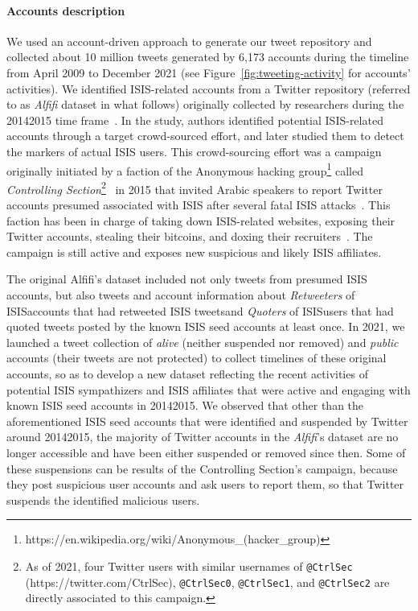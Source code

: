 \documentclass[letterpaper]{article} %
\begin{document}

\paragraph{Accounts description} We used an account-driven approach to generate our tweet repository and  collected about 10 million tweets generated  by 6,173 accounts during the timeline from April 2009 to December 2021 (see Figure~\ref{fig:tweeting-activity} for accounts' activities).
We identified ISIS-related accounts  from a Twitter repository (referred to as \textit{Alfifi} dataset in what follows) originally collected by researchers during the 20142015 time frame~\cite{alfifi2018measuring}. In the study, authors   identified  potential ISIS-related accounts through a target crowd-sourced effort, and later studied them to detect  the markers of actual ISIS users. This crowd-sourcing effort was a campaign originally initiated by a faction of the Anonymous hacking group\footnote{https://en.wikipedia.org/wiki/Anonymous\_(hacker\_group)} called \textit{Controlling Section}\footnote{As of 2021, four Twitter users with similar usernames of \texttt{@CtrlSec} (https://twitter.com/CtrlSec), \texttt{@CtrlSec0}, \texttt{@CtrlSec1}, and \texttt{@CtrlSec2} are directly associated to this campaign.}~\cite{ctrl-sec} in 2015 that invited Arabic speakers to report Twitter accounts presumed associated  with  ISIS after several fatal ISIS attacks~\cite{anon-hacktivist}. This faction has been in charge of taking down ISIS-related websites, exposing their Twitter accounts, stealing their bitcoins, and doxing their recruiters~\cite{ctrl-sec}. The campaign is still active and exposes new suspicious and likely ISIS affiliates.

The original Alfifi's dataset included not only tweets from presumed  ISIS  accounts, but also tweets and account information about {\em Retweeters} of ISISaccounts that had retweeted ISIS tweetsand {\em Quoters} of ISISusers that had quoted tweets posted by the known ISIS seed accounts at least once. In 2021,  we launched  a tweet collection of  \textit{alive} (neither suspended nor removed) and {\em public} accounts (their tweets are not protected) to collect timelines of these original accounts, so as to develop a new dataset reflecting the recent activities of potential ISIS sympathizers and ISIS affiliates that were active and engaging with known ISIS seed accounts in 20142015. We observed that other than the aforementioned ISIS seed accounts that were identified and suspended by Twitter around 20142015, the majority of  Twitter accounts in the \textit{Alfifi}'s dataset are no longer accessible and have been either suspended or removed since then. Some of these suspensions can be results of the Controlling Section's campaign, because they post suspicious user accounts and ask users to report them, so that Twitter suspends the identified malicious users.
\end{document}
